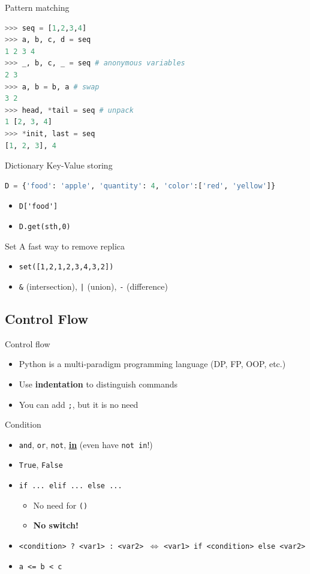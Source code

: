 \documentclass{../TexTemplate/myslide}
\begin{document}
\begin{frame}[fragile]{Pattern matching}
\begin{lstlisting}[language=python]
>>> seq = [1,2,3,4]
>>> a, b, c, d = seq
1 2 3 4
>>> _, b, c, _ = seq # anonymous variables
2 3
>>> a, b = b, a # swap
3 2
>>> head, *tail = seq # unpack
1 [2, 3, 4]
>>> *init, last = seq
[1, 2, 3], 4
\end{lstlisting}
\end{frame}

\begin{frame}[fragile]{Dictionary}
Key-Value storing
\begin{lstlisting}[language=python]
D = {'food': 'apple', 'quantity': 4, 'color':['red', 'yellow']}
\end{lstlisting}
\begin{itemize}
	\item \verb;D['food'];
	\item \verb'D.get(sth,0)'
\end{itemize}
\end{frame}

\begin{frame}[fragile]{Set}
A fast way to remove replica
\begin{itemize}
	\item \verb'set([1,2,1,2,3,4,3,2])'
	\item \verb'&' (intersection), \verb'|' (union), \verb'-' (difference)
\end{itemize}
\end{frame}

\subsection{Control Flow}
\begin{frame}[fragile]{Control flow}
\begin{itemize}
	\item Python is a multi-paradigm programming language (DP, FP, OOP, etc.)
	\item Use \textbf{indentation} to distinguish commands
	\item You can add \verb';', but it is no need
\end{itemize}
\end{frame}

\begin{frame}[fragile]{Condition}
\begin{itemize}
	\item \verb'and', \verb'or', \verb'not', \underline{\textbf{in}} (even have \verb'not in'!)
	\item \verb'True', \verb'False'
	\item \verb'if ... elif ... else ...'
	\begin{itemize}
		\item No need for \verb'()'
		\item \textbf{No switch!}
	\end{itemize}
	\item \verb'<condition> ? <var1> : <var2> '$\iff$ \verb'<var1> if <condition> else <var2>'
	\item \verb'a <= b < c'
\end{itemize}
\end{frame}
\end{document}
